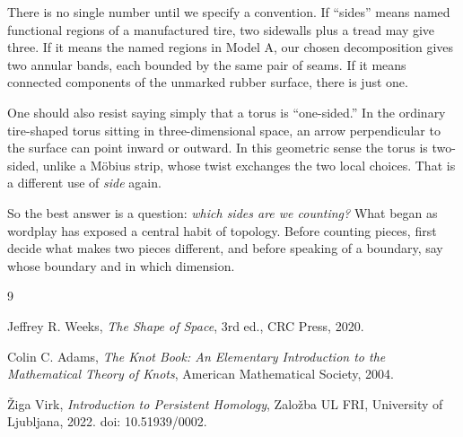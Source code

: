 \documentclass[12pt]{article}
\begin{document}
There is no single number until we specify a convention.  If ``sides'' means
named functional regions of a manufactured tire, two sidewalls plus a tread may
give three.  If it means the named regions in Model A, our chosen decomposition
gives two annular bands, each bounded by the same pair of seams.  If it means
connected components of the unmarked rubber surface, there is just one.

One should also resist saying simply that a torus is ``one-sided.''  In the
ordinary tire-shaped torus sitting in three-dimensional space, an arrow
perpendicular to the surface can point inward or outward.  In this geometric
sense the torus is two-sided, unlike a M\"obius strip, whose twist exchanges the
two local choices.  That is a different use of \emph{side} again.

So the best answer is a question: \emph{which sides are we counting?}  What
began as wordplay has exposed a central habit of topology.  Before counting
pieces, first decide what makes two pieces different, and before speaking of a
boundary, say whose boundary and in which dimension.

\renewcommand{\refname}{Further Reading}
\begin{thebibliography}{9}

Jeffrey R. Weeks,
\emph{The Shape of Space},
3rd ed., CRC Press, 2020.

Colin C. Adams,
\emph{The Knot Book: An Elementary Introduction to the Mathematical Theory of
Knots},
American Mathematical Society, 2004.

{\v Z}iga Virk,
\emph{Introduction to Persistent Homology},
Zalo{\v z}ba UL FRI, University of Ljubljana, 2022.
doi: 10.51939/0002.

\end{thebibliography}
\end{document}

